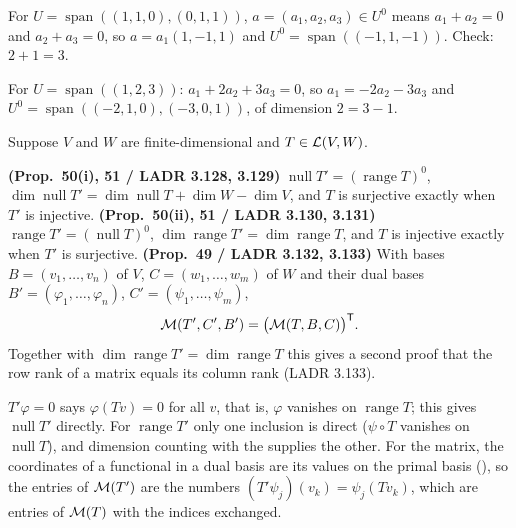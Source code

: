 \documentclass[10pt]{scrartcl}
\DeclareMathOperator{\spn}{span}\DeclareMathOperator{\nul}{null}\DeclareMathOperator{\range}{range}
\begin{document}
\begin{example*}
  For $U=\spn((1,1,0),(0,1,1))$, $a=(a_1,a_2,a_3)\in U^0$ means $a_1+a_2=0$ and $a_2+a_3=0$, so $a=a_1(1,-1,1)$ and $U^0=\spn((-1,1,-1))$. Check: $2+1=3$.
\end{example*}

\begin{example*}
  For $U=\spn((1,2,3))$: $a_1+2a_2+3a_3=0$, so $a_1=-2a_2-3a_3$ and $U^0=\spn((-2,1,0),(-3,0,1))$, of dimension $2=3-1$.
\end{example*}

\begin{theorem*}
  Suppose $V$ and $W$ are finite-dimensional and $T\in\mathcal L(V,W)$.
  \begin{enumerate}[(a)]
    \ii \textbf{(Prop.~50(i), 51 / LADR 3.128, 3.129)} $\nul T' = (\range T)^0$, $\dim\nul T' = \dim\nul T + \dim W - \dim V$, and $T$ is surjective exactly when $T'$ is injective.
    \ii \textbf{(Prop.~50(ii), 51 / LADR 3.130, 3.131)} $\range T' = (\nul T)^0$, $\dim\range T' = \dim\range T$, and $T$ is injective exactly when $T'$ is surjective.
    \ii \textbf{(Prop.~49 / LADR 3.132, 3.133)} With bases $B=(v_1,\dots,v_n)$ of $V$, $C=(w_1,\dots,w_m)$ of $W$ and their dual bases $B'=(\varphi_1,\dots,\varphi_n)$, $C'=(\psi_1,\dots,\psi_m)$,
    \[
      \mathcal M(T', C', B') = \big(\mathcal M(T, B, C)\big)^{\mathsf T}.
    \]
    Together with $\dim\range T'=\dim\range T$ this gives a second proof that the row rank of a matrix equals its column rank (LADR 3.133).
  \end{enumerate}
\end{theorem*}
\begin{ideabox}
  $T'\varphi=0$ says $\varphi(Tv)=0$ for all $v$, that is, $\varphi$ vanishes on $\range T$; this gives $\nul T'$ directly. For $\range T'$ only one inclusion is direct ($\psi\circ T$ vanishes on $\nul T$), and dimension counting with the  supplies the other. For the matrix, the coordinates of a functional in a dual basis are its values on the primal basis (), so the entries of $\mathcal M(T')$ are the numbers $(T'\psi_j)(v_k)=\psi_j(Tv_k)$, which are entries of $\mathcal M(T)$ with the indices exchanged.
\end{ideabox}
\end{document}

